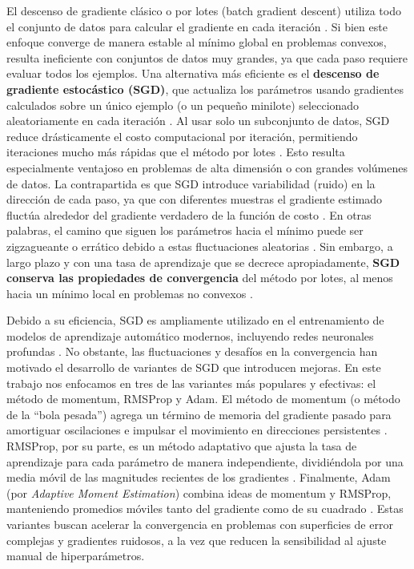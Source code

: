 \documentclass[12pt, spanish]{article}
\begin{document}
El descenso de gradiente clásico o por lotes (batch gradient descent) utiliza todo el conjunto de datos para calcular el gradiente en cada iteración \cite{ref5}. Si bien este enfoque converge de manera estable al mínimo global en problemas convexos, resulta ineficiente con conjuntos de datos muy grandes, ya que cada paso requiere evaluar todos los ejemplos. Una alternativa más eficiente es el \textbf{descenso de gradiente estocástico (SGD)}, que actualiza los parámetros usando gradientes calculados sobre un único ejemplo (o un pequeño minilote) seleccionado aleatoriamente en cada iteración \cite{ref6,ref7}. Al usar solo un subconjunto de datos, SGD reduce drásticamente el costo computacional por iteración, permitiendo iteraciones mucho más rápidas que el método por lotes \cite{ref6}. Esto resulta especialmente ventajoso en problemas de alta dimensión o con grandes volúmenes de datos. La contrapartida es que SGD introduce variabilidad (ruido) en la dirección de cada paso, ya que con diferentes muestras el gradiente estimado fluctúa alrededor del gradiente verdadero de la función de costo \cite{ref7}. En otras palabras, el camino que siguen los parámetros hacia el mínimo puede ser zigzagueante o errático debido a estas fluctuaciones aleatorias \cite{ref8}. Sin embargo, a largo plazo y con una tasa de aprendizaje que se decrece apropiadamente, \textbf{SGD conserva las propiedades de convergencia} del método por lotes, al menos hacia un mínimo local en problemas no convexos \cite{ref9}.

Debido a su eficiencia, SGD es ampliamente utilizado en el entrenamiento de modelos de aprendizaje automático modernos, incluyendo redes neuronales profundas \cite{ref10}. No obstante, las fluctuaciones y desafíos en la convergencia han motivado el desarrollo de variantes de SGD que introducen mejoras. En este trabajo nos enfocamos en tres de las variantes más populares y efectivas: el método de momentum, RMSProp y Adam. El método de momentum (o método de la “bola pesada”) agrega un término de memoria del gradiente pasado para amortiguar oscilaciones e impulsar el movimiento en direcciones persistentes \cite{ref4}. RMSProp, por su parte, es un método adaptativo que ajusta la tasa de aprendizaje para cada parámetro de manera independiente, dividiéndola por una media móvil de las magnitudes recientes de los gradientes \cite{ref3}. Finalmente, Adam (por \textit{Adaptive Moment Estimation}) combina ideas de momentum y RMSProp, manteniendo promedios móviles tanto del gradiente como de su cuadrado \cite{ref2}. Estas variantes buscan acelerar la convergencia en problemas con superficies de error complejas y gradientes ruidosos, a la vez que reducen la sensibilidad al ajuste manual de hiperparámetros.
\end{document}

